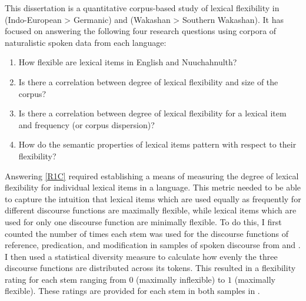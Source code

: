 This dissertation is a quantitative corpus-based study of lexical flexibility in  (Indo-European > Germanic) and  (Wakashan > Southern Wakashan). It has focused on answering the following four research questions using corpora of naturalistic spoken data from each language:

\begin{enumerate}[
  label      = {\textbf{R\arabic*:}},
  leftmargin = *,
  ref        = {R\arabic*}
]
  \item\label{R1C} How flexible are lexical items in English and Nuuchahnulth?
  \item\label{R2C} Is there a correlation between degree of lexical flexibility and size of the corpus?
  \item\label{R3C} Is there a correlation between degree of lexical flexibility for a lexical item and frequency (or corpus dispersion)?
  \item\label{R4C} How do the semantic properties of lexical items pattern with respect to their flexibility?
\end{enumerate}

Answering \ref{R1C} required establishing a means of measuring the degree of lexical flexibility for individual lexical items in a language. This metric needed to be able to capture the intuition that lexical items which are used equally as frequently for different discourse functions are maximally flexible, while lexical items which are used for only one discourse function are minimally flexible. To do this, I first counted the number of times each stem was used for the discourse functions of reference, predication, and modification in samples of spoken discourse from  and . I then used a statistical diversity measure  to calculate how evenly the three discourse functions are distributed across its tokens. This resulted in a flexibility rating for each stem ranging from $0$ (maximally inflexible) to $1$ (maximally flexible). These ratings are provided for each stem in both samples in .

